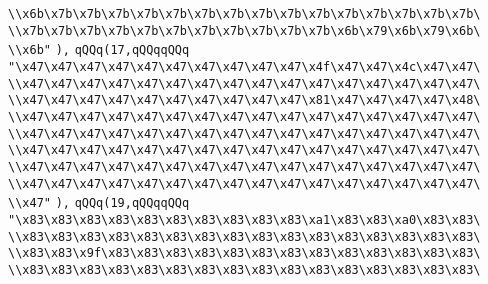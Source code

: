 \verb|\\x6b\x7b\x7b\x7b\x7b\x7b\x7b\x7b\x7b\x7b\x7b\x7b\x7b\x7b\x7b\x7b\|\newline
\verb|\\x7b\x7b\x7b\x7b\x7b\x7b\x7b\x7b\x7b\x7b\x7b\x6b\x79\x6b\x79\x6b\|\newline
\verb|\\x6b"|\newline
\verb|),|\newline
\verb|qQQq(17,qQQqqQQq|\newline
\verb|"\x47\x47\x47\x47\x47\x47\x47\x47\x47\x47\x4f\x47\x47\x4c\x47\x47\|\newline
\verb|\\x47\x47\x47\x47\x47\x47\x47\x47\x47\x47\x47\x47\x47\x47\x47\x47\|\newline
\verb|\\x47\x47\x47\x47\x47\x47\x47\x47\x47\x47\x81\x47\x47\x47\x47\x48\|\newline
\verb|\\x47\x47\x47\x47\x47\x47\x47\x47\x47\x47\x47\x47\x47\x47\x47\x47\|\newline
\verb|\\x47\x47\x47\x47\x47\x47\x47\x47\x47\x47\x47\x47\x47\x47\x47\x47\|\newline
\verb|\\x47\x47\x47\x47\x47\x47\x47\x47\x47\x47\x47\x47\x47\x47\x47\x47\|\newline
\verb|\\x47\x47\x47\x47\x47\x47\x47\x47\x47\x47\x47\x47\x47\x47\x47\x47\|\newline
\verb|\\x47\x47\x47\x47\x47\x47\x47\x47\x47\x47\x47\x47\x47\x47\x47\x47\|\newline
\verb|\\x47"|\newline
\verb|),|\newline
\verb|qQQq(19,qQQqqQQq|\newline
\verb|"\x83\x83\x83\x83\x83\x83\x83\x83\x83\x83\xa1\x83\x83\xa0\x83\x83\|\newline
\verb|\\x83\x83\x83\x83\x83\x83\x83\x83\x83\x83\x83\x83\x83\x83\x83\x83\|\newline
\verb|\\x83\x83\x9f\x83\x83\x83\x83\x83\x83\x83\x83\x83\x83\x83\x83\x83\|\newline
\verb|\\x83\x83\x83\x83\x83\x83\x83\x83\x83\x83\x83\x83\x83\x83\x83\x83\|\newline
